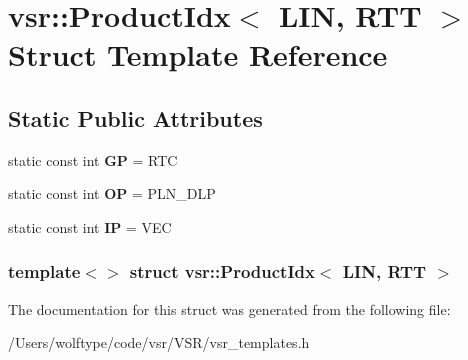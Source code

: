 \hypertarget{structvsr_1_1_product_idx_3_01_l_i_n_00_01_r_t_t_01_4}{\section{vsr\-:\-:Product\-Idx$<$ L\-I\-N, R\-T\-T $>$ Struct Template Reference}
\label{structvsr_1_1_product_idx_3_01_l_i_n_00_01_r_t_t_01_4}
}
\subsection*{Static Public Attributes}
\begin{DoxyCompactItemize}
\item 
\hypertarget{structvsr_1_1_product_idx_3_01_l_i_n_00_01_r_t_t_01_4_a42ad04a217d167bf660bfd5142bb47c5}{static const int {\bfseries G\-P} = R\-T\-C}\label{structvsr_1_1_product_idx_3_01_l_i_n_00_01_r_t_t_01_4_a42ad04a217d167bf660bfd5142bb47c5}

\item 
\hypertarget{structvsr_1_1_product_idx_3_01_l_i_n_00_01_r_t_t_01_4_a04c4a28c06fb9bc741666ceb21392c25}{static const int {\bfseries O\-P} = P\-L\-N\-\_\-\-D\-L\-P}\label{structvsr_1_1_product_idx_3_01_l_i_n_00_01_r_t_t_01_4_a04c4a28c06fb9bc741666ceb21392c25}

\item 
\hypertarget{structvsr_1_1_product_idx_3_01_l_i_n_00_01_r_t_t_01_4_a93b4135ac6e0bf84bbd096fc941afbfc}{static const int {\bfseries I\-P} = V\-E\-C}\label{structvsr_1_1_product_idx_3_01_l_i_n_00_01_r_t_t_01_4_a93b4135ac6e0bf84bbd096fc941afbfc}

\end{DoxyCompactItemize}
\subsubsection*{template$<$$>$ struct vsr\-::\-Product\-Idx$<$ L\-I\-N, R\-T\-T $>$}



The documentation for this struct was generated from the following file\-:\begin{DoxyCompactItemize}
\item 
/\-Users/wolftype/code/vsr/\-V\-S\-R/vsr\-\_\-templates.\-h\end{DoxyCompactItemize}
